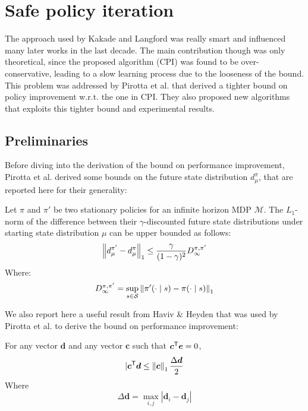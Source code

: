\section{Safe policy iteration}
\label{sec:spi}
The approach used by Kakade and Langford was really smart and influenced many later works in the last decade. The main contribution though was only theoretical, since the proposed algorithm (CPI) was found to be over-conservative, leading to a slow learning process due to the looseness of the bound. \\
This problem was addressed by Pirotta et al. \cite{safe_iteration} that derived a tighter bound on policy improvement w.r.t. the one in CPI. They also proposed new algorithms that exploits this tighter bound and experimental results.

\subsection{Preliminaries}
Before diving into the derivation of the bound on performance improvement, Pirotta et al. derived some bounds on the future state distribution $d_{\mu}^{\pi}$, that are reported here for their generality:

\begin{theorem}
Let $\pi$ and $\pi'$ be two stationary policies for an infinite horizon MDP $\mathcal{M}$. The $L_1$-norm of the difference between their $\gamma$-discounted future state distributions under starting state distribution $\mu$ can be upper bounded as follows:
\begin{equation}
\left\| d_{\mu}^{\pi'} - d_{\mu}^{\pi} \right\|_{1} \leq \frac{\gamma}{(1-\gamma)^2}D_\infty^{\pi, \pi'}
\end{equation}
Where:
\begin{equation}
D_\infty^{\pi, \pi'} = \sup_{s\in\mathcal{S}}\left\| \pi'(\cdot\mid s) - \pi(\cdot \mid s) \right\|_{1}
\end{equation}
\end{theorem}

We also report here a useful result from Haviv \& Heyden that was used by Pirotta et al. to derive the bound on performance improvement:

\begin{theorem} \label{th:haviv-heiden}
For any vector $\boldsymbol{d}$ and any vector $\boldsymbol{c}$ such that ${\boldsymbol{c}}^{\mathsf{T}}\boldsymbol{e} = 0$,
\[
|{\boldsymbol{c}}^{\mathsf{T}}\boldsymbol{d} \leq \left\| \boldsymbol{c} \right\|_{1}\frac{\Delta\boldsymbol{d}}{2}
\] 
Where
\[
\Delta \boldsymbol{d} = \max_{i,j} \left| \boldsymbol{d}_i - \boldsymbol{d}_j \right|
\]
\end{theorem}

